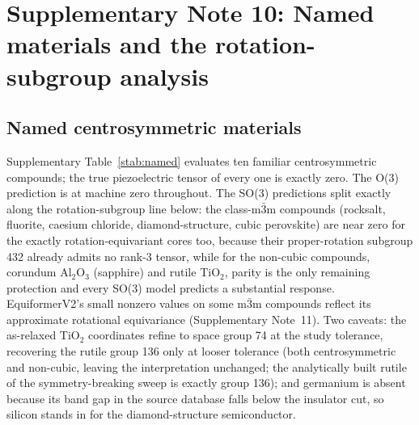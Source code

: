 \section*{Supplementary Note 10: Named materials and the rotation-subgroup analysis}

\subsection*{Named centrosymmetric materials}

Supplementary Table~\ref{stab:named} evaluates ten familiar centrosymmetric compounds; the true piezoelectric tensor of every one is exactly zero. The O(3) prediction is at machine zero throughout. The SO(3) predictions split exactly along the rotation-subgroup line  below: the class-m$\bar 3$m compounds (rocksalt, fluorite, caesium chloride, diamond-structure, cubic perovskite) are near zero for the exactly rotation-equivariant cores too, because their proper-rotation subgroup 432 already admits no rank-3 tensor, while for the non-cubic compounds, corundum Al$_2$O$_3$ (sapphire) and rutile TiO$_2$, parity is the only remaining protection and every SO(3) model predicts a substantial response. EquiformerV2's small nonzero values on some m$\bar 3$m compounds reflect its approximate rotational equivariance (Supplementary Note~11). Two caveats: the as-relaxed TiO$_2$ coordinates refine to space group 74 at the study tolerance, recovering the rutile group 136 only at looser tolerance (both centrosymmetric and non-cubic, leaving the interpretation unchanged; the analytically built rutile of the symmetry-breaking sweep is exactly group 136); and germanium is absent because its band gap in the source database falls below the insulator cut, so silicon stands in for the diamond-structure semiconductor.

